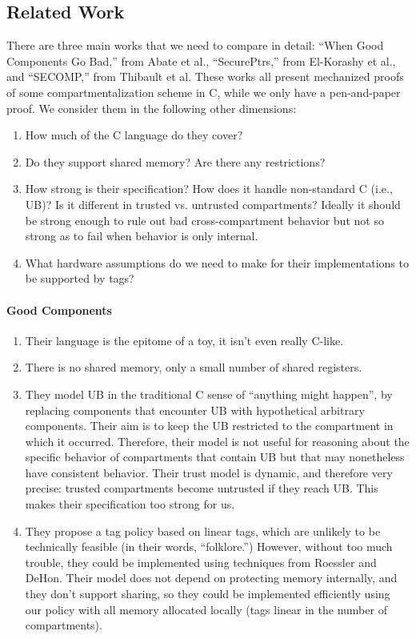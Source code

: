 \documentclass{article}
\begin{document}
\subsection{Related Work}

There are three main works that we need to compare in detail: ``When Good Components Go Bad,''
from Abate et al., ``SecurePtrs,'' from El-Korashy et al., and ``SECOMP,'' from Thibault et al.
These works all present mechanized proofs of some compartmentalization scheme in C, while we
only have a pen-and-paper proof. We consider them in the following other dimensions:
\begin{enumerate}
\item How much of the C language do they cover?
\item Do they support shared memory? Are there any restrictions?
\item How strong is their specification? How does it handle non-standard C (i.e., UB)?
  Is it different in trusted vs. untrusted compartments? Ideally it should be strong enough
  to rule out bad cross-compartment behavior but not so strong as to fail when behavior
  is only internal.
\item What hardware assumptions do we need to make for their implementations to be supported
  by tags?
\end{enumerate}

\paragraph{Good Components}

\begin{enumerate}
\item Their language is the epitome of a toy, it isn't even really C-like.
\item There is no shared memory, only a small number of shared registers.
\item They model UB in the traditional C sense of ``anything might happen'', by replacing
  components that encounter UB with hypothetical arbitrary components. Their aim is to keep
  the UB restricted to the compartment in which it occurred. Therefore, their model is not
  useful for reasoning about the specific behavior of compartments that contain UB but that
  may nonetheless have consistent behavior. Their trust model is dynamic, and therefore very
  precise: trusted compartments become untrusted if they reach UB.
  This makes their specification too strong for us.
\item They propose a tag policy based on linear tags, which are unlikely to be technically
  feasible (in their words, ``folklore.'') However, without too much trouble, they could be
  implemented using techniques from Roessler and DeHon. Their model does not depend on protecting
  memory internally, and they don't support sharing, so they could be implemented efficiently
  using our policy with all memory allocated locally (tags linear in the number of compartments).
\end{enumerate}
\end{document}
